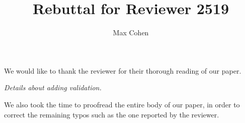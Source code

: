 \documentclass{article}
\title{Rebuttal for Reviewer 2519}
\author{Max Cohen}
\affil{Samovar, T\'el\'ecom SudParis, CITI, TIPIC, Institut Polyechnique de Paris}
\date{}
\begin{document}
\maketitle

We would like to thank the reviewer for their thorough reading of our paper.

\textit{Details about adding validation.}

We also took the time to proofread the entire body of our paper, in order to correct the remaining typos such as the one reported by the reviewer.



\end{document}
